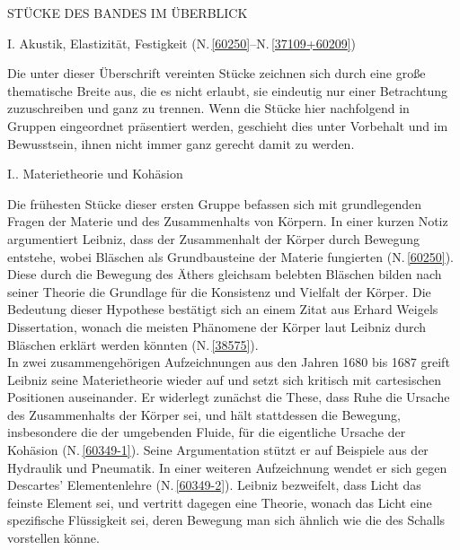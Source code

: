 \newpage
\vspace{6.0em}
\noindent\uppercase{Stücke des Bandes im Überblick}
\par\vspace{1.0em}
\noindent
I. Akustik, Elastizität, Festigkeit (N.\,\ref{60250}--N.\,\ref{37109+60209})%
\par
\vspace{0.25em}
\noindent
Die unter dieser Überschrift vereinten Stücke zeichnen sich durch eine große thematische Breite aus, die es nicht erlaubt, sie eindeutig nur einer Betrachtung zuzuschreiben und ganz zu trennen. 
Wenn die Stücke hier nachfolgend in Gruppen eingeordnet präsentiert werden, geschieht dies unter Vorbehalt und im Bewusstsein, ihnen nicht immer ganz gerecht damit zu werden.%
\par
\vspace{1.0em}
\noindent
I.. Materietheorie und Kohäsion%
\par \noindent
Die frühesten Stücke dieser ersten Gruppe befassen sich mit grundlegenden Fragen der Materie und des Zusammenhalts von Körpern. In einer kurzen Notiz argumentiert Leibniz, dass der Zusammenhalt der Körper durch Bewegung entstehe, wobei Bläschen als Grundbausteine der Materie fungierten (N.\,\ref{60250}). Diese durch die Bewegung des Äthers gleichsam belebten Bläschen bilden nach seiner Theorie die Grundlage für die Konsistenz und Vielfalt der Körper. Die Bedeutung dieser Hypothese bestätigt sich an einem Zitat aus Erhard Weigels Dissertation, wonach die meisten Phänomene der Körper laut Leibniz durch Bläschen erklärt werden könnten (N.\,\ref{38575}).
\\ \indent
In zwei zusammengehörigen Aufzeichnungen aus den Jahren 1680 bis 1687 greift Leibniz seine Materietheorie wieder auf und setzt sich kritisch mit cartesischen Positionen auseinander. Er widerlegt zunächst die These, dass Ruhe die Ursache des Zusammenhalts der Körper sei, und hält stattdessen die Bewegung, insbesondere die der umgebenden Fluide, für die eigentliche Ursache der Kohäsion (N.\,\ref{60349-1}). Seine Argumentation stützt er auf Beispiele aus der Hydraulik und Pneumatik. In einer weiteren Aufzeichnung wendet er sich gegen Descartes' Elementenlehre  (N.\,\ref{60349-2}). Leibniz bezweifelt, dass Licht das feinste Element sei, und vertritt dagegen eine Theorie, wonach das Licht eine spezifische Flüssigkeit sei, deren Bewegung man sich ähnlich wie die des Schalls vorstellen könne.

